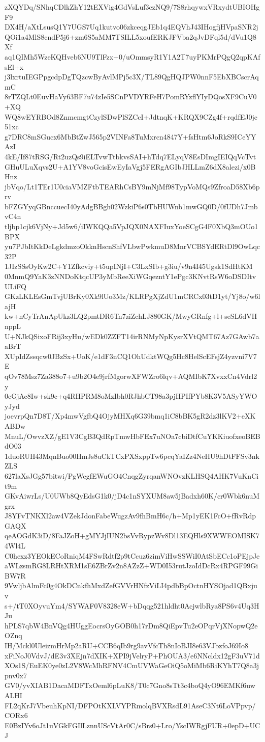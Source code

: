 zXQYDq/SNhqCDlkZhY12tEXVig4GdVsLuf3czNQ9/7S8rhqywxVRxydtUBIOHgF9
DX4H/aXtLsusQ1Y7UGS7Uq1kutvo06zkceqgJEb1q4EQVhJ43IHogfjHVpaSNR2j
QOi1a4MlS8cndP5j6+zm6S5aMM7TSILL5xoufERKJFVba2qJvDFql5d/dVu1Q8Xf
aq1QIMh5WzeKQHveb6NU9TlFzx+0/uOmmsyR1Y1A2T7uyPKMrPQgQ2qpKAfsEl+x
j3lxrtuIEGPpgcdpDgTQzcwByAvlMPj5c3X/TL89QgHQJPW0nnF5EbXBCscrAqmC
8rTZQLt0EuvHaVy63BF7u74zIe5SCnPVDYRFeH7PomRYzflYIyDQosXF9CuV0+XQ
WQ8wEYRBOd8ZnmcmgtCzylSDwPlSZCcI+JdtnqK+KRQX9CZg4f+rqdfEJ0jc51xc
g7DRC8mSGucx6MbBtZwJ565p2VINFa8TuMxrcn4847Y+fsHtm6JoRkS9ICeYYAzI
4kE/If87tRSG/Rt2uzQs9iELTvwTtbkvsSAI+hTdq7ELyqV8EsDImgIEIQqVcTvt
GHuULuXqvs2U+A1YV8voGcisEwEyIaVgj5FERgAGIbJHLLmZ6dX8alezi/x0BHnz
jbVqo/Lt1TEr1U0ciaVMZFtbTEARhCsBY9mNjMf98TypVoMQs9ZfroaD58Xb6prv
bFZGYyqGBnccuecI40yAdgBBgh02WzkiP6s0TbHUWnb1mwGQ0D/0fUDh7JmbvC4n
tljbp1cjk6VjNy+Jd5w6/iIWKQQa5VpJQX0NAXFIuxYoeSCgG4F0XbQ3mOUo1BPX
yu7PJbItKkDeLgkdmzoOkknHscnShfVLbwPwkmuD8MnrVCBSYdERtDl9OwLqc32P
1JIzSSsOyKw2C+Y1Zfkcviy+t5upINjI+C3LxSIb+g3iu/v9n4I45Ugsk1SdHtKM
0MnmQ9YaK3zNNDoKtqcUP3yMbReeXiWGqezntY1ePgc3KNvtRsW6oDSDItvULiFQ
GKzLKLEsGmTvjUBrKy0Xk9lUo3Mz/KLRPgXjZdU1mCRCx03tD1yt/Yj8o/w6lajH
kw+nCyTrAnApUkz3LQ2pmtDR6Tn7ziZchLJ880GK/MwyGRnfg+l+seSL6dVHnppL
U+NJkQSixoFRij3xyHu/wEDk0ZZFT14irRNMyNpKysrXVtQMT67Az7GAwb7aaBrT
XUpIdZssqcw0JBzSx+UoK/e1dF3nCQ1OhUdktWQg5Hc8HelScEFsjZ4yzvni7V7E
qOv78Msz7Za388o7+u9b2O4e9jrfMgorwXFWZro6lqv+AQMIbK7XvxxCn4Vdrl2y
0cGjAc8Iw+sk9c+q4RHPRM8oMzIbh0RJhbCT98a3pjHPIfPYb8K3V5ASyYWOyJyd
joevrpQn7D8T/Xp4mwVgfbQ4OjyMHXq6G39bmq1iC8bBK5gR2dz3lKV2+eXKABDw
MnuL/OwvzXZ/gE1V3CgB3QdRpTmwHbFEx7uNOa7cbiDtfCuYKKiuofxeoBEBdO03
1duoRUH43MqnBuo00HmJs8uCkTCxPXSxppTw6pcqYaIZz4NeHU9hDtFFSv3nkZLS
627laXsJGg57bitwi/PgWegfEWuGO4CnqgZyrqanWNOvzKLHSQ4AHK7VuKnCit9m
GKvAiwrLs/U0UWb8QyEdsG1k0/jD4c1nSYXUM8aw5jBadxh60K/cr0Wbk6nuMgrx
J8YFvTNKXl2aw4VZekJdonFabeWugzAv9fhBmH6c/h+Mp1yEK1FcO+fRvRdpGAQX
qeAOGdK3iD/8FaJZoH+gMYJjIUN2bsVvRypzWv8Dl13EQHls9XWWEOMISK74Wl4L
C0hexz3YEOkECoRniqM4FSwRdtf2p9tCcuz6zimViHwSSWiI0AtSbECc1oPEjpJe
aWLzsmRG8LRHtXRM1sE6ZBrZv2n8AZzZ+WD0I53rutJzoIdDcRx4RPGF99GiBW7R
9VwljbAlmFc0g4OkDCnkfhMxdZefGVVrHNfzViLI4pdbBpOctnHYSOjad1QBxjuv
s+/tT0XOyvuYm4/SYWAF0V8328eW+bDqqg521hldht0AcjwlbRya8PS6v4Uq3HJu
hPLS7qbW4BnVQg4HUggEocrsOyGOB0h17rDm8QiEpvTu2eOPqrVjXNopwQ2eOZnq
IH/Mckl0UleizmHrMp2aRU+CCB6qIb9rg9avVfcTh8nIoBJI8e63VJbzfoJ69Io8
xFiNoJ0VdvJ/dE3v3XEjn7dXIK+XPI9jVelryP+PhOUA3/e6NNcldx12gF3uV71d
XOs1S/EuEK0ye0zL2V8WcMhRFNV4CmUVWaGeOiQ5oMiMb6RiKYhT7Q8a3jpnv0x7
GV0/yvXIAB1DacaMDFTxOeml6pLuK8/T0c7Gno8sTt3c4boQ4yO96EMKf6uwALHI
FL2qKrJ7VbeuhKpNI/DFPOtKXLVYPRmolqBVXRsdL91AseC3Nt6LoVPpvp/CORx6
E0BzIYv6oJt1uVGkFGIlLznnUScVtAr0C/sBrs0+Lro/YscIWRgjFUR+0epD+UCJ
